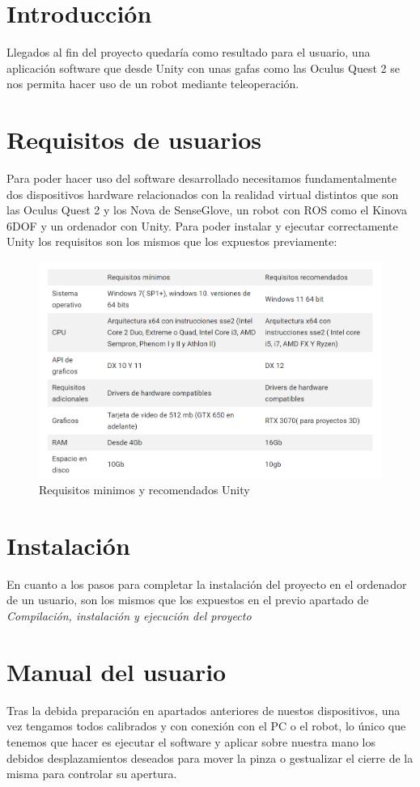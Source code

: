 \section{Introducción}
Llegados al fin del proyecto quedaría como resultado para el usuario, una aplicación software que desde Unity con unas gafas como las Oculus Quest 2 se nos permita hacer uso de un robot mediante teleoperación. 
\section{Requisitos de usuarios}
Para poder hacer uso del software desarrollado necesitamos fundamentalmente dos dispositivos hardware relacionados con la realidad virtual distintos que son las Oculus Quest 2 y los Nova de SenseGlove, un robot con ROS como el Kinova 6DOF y un ordenador con Unity.
Para poder instalar y ejecutar correctamente Unity los requisitos son los mismos que los expuestos previamente:
\begin{figure}[h]
\centering
\label{Requisitos minimos y recomendados Unity}
\includegraphics[width=\textwidth]{img/unity req.PNG}
\caption{Requisitos minimos y recomendados Unity}
\end{figure}

\newpage
\section{Instalación}

En cuanto a los pasos para completar la instalación del proyecto en el ordenador de un usuario, son los mismos que los expuestos en el previo apartado de \textit{Compilación, instalación y ejecución del proyecto}

\section{Manual del usuario}
Tras la debida preparación en apartados anteriores de nuestos dispositivos, una vez tengamos todos calibrados y con conexión con el PC o el robot, lo único que tenemos que hacer es ejecutar el software y aplicar sobre nuestra mano los debidos desplazamientos deseados para mover la pinza o gestualizar el cierre de la misma para controlar su apertura.

